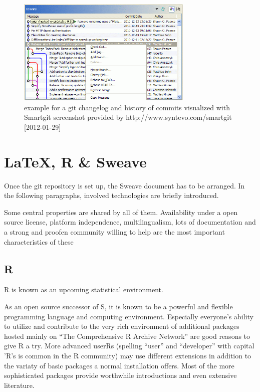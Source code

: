 \documentclass{ifacconf}
\begin{document}
\begin{figure}[h]
\begin{center}
\includegraphics[width=8.4cm]{pics/Smartgit_graphical_Log.png}    %
\caption{example for a git changelog and history of commits visualized with Smartgit \newline 
screenshot provided by http://www.syntevo.com/smartgit [2012-01-29]} 
\label{fig:gitHistory}
\end{center}
\end{figure}

\section{\LaTeX, R \& Sweave}\label{sec:structure}

Once the git repository is set up, the Sweave document has to be arranged. 
In the following paragraphs, involved technologies are briefly introduced.

Some central properties are shared by all of them. Availability under a open source license, 
platform independence, multilingualism, lots of documentation and a strong and proofen 
community willing to help are the most important characteristics of these


\subsection{R}
R \citep{R} is known as an upcoming statistical environment. 

As an open source successor of S, it is known to be a powerful and flexible programming language
and computing environment. Especially everyone’s ability to utilize and
contribute to the very rich environment of additional packages hosted 
mainly on “The Comprehensive R Archive Network” are good reasons to give R a try. 
More advanced userRs (spelling “user” and “developer” with capital
’R’s is common in the R community) may use different extensions in 
addition to the variaty of basic packages a normal installation offers.
Most of the more sophisticated packages provide worthwhile 
introductions and even extensive literature. 
\end{document}
